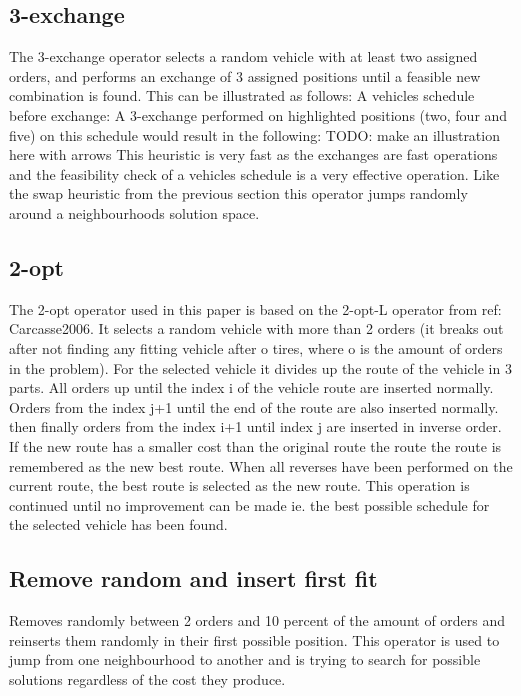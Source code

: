 \documentclass[../main.tex]{subfiles}
\begin{document}
\subsection{3-exchange}
\label{sec:exch}
The 3-exchange operator selects a random vehicle with at least two assigned orders, and performs an exchange of 3 assigned positions until a feasible new combination is found. This can be illustrated as follows: \newline
A vehicles schedule before exchange:  \newline
A 3-exchange performed on highlighted positions (two, four and five) on this schedule would result in the following:   TODO: make an illustration here with arrows \newline
This heuristic is very fast as the exchanges are fast operations and the feasibility check of a vehicles schedule is a very effective operation. Like the swap heuristic from the previous section this operator jumps randomly around a neighbourhoods solution space.

\subsection{2-opt}
\label{sec:2opt}
The 2-opt operator used in this paper is based on the 2-opt-L operator from {ref: Carcasse2006}. 
It selects a random vehicle with more than 2 orders (it breaks out after not finding any fitting vehicle after o tires, where o is the amount of orders in the problem).
For the selected vehicle it divides up the route of the vehicle in 3 parts. 
All orders up until the index i of the vehicle route are inserted normally. 
Orders from the index j+1 until the end of the route are also inserted normally. 
then finally orders from the index i+1 until index j are inserted in inverse order.
If the new route has a smaller cost than the original route the route the route is remembered as the new best route. 
When all reverses have been performed on the current route, the best route is selected as the new route.
This operation is continued until no improvement can be made ie. the best possible schedule for the selected vehicle has been found.

\subsection{Remove random and insert first fit}
\label{sec:rand}
Removes randomly between 2 orders and 10 percent of the amount of orders and reinserts them randomly in their first possible position. 
This operator is used to jump from one neighbourhood to another and is trying to search for possible solutions regardless of the cost they produce.
\end{document}
